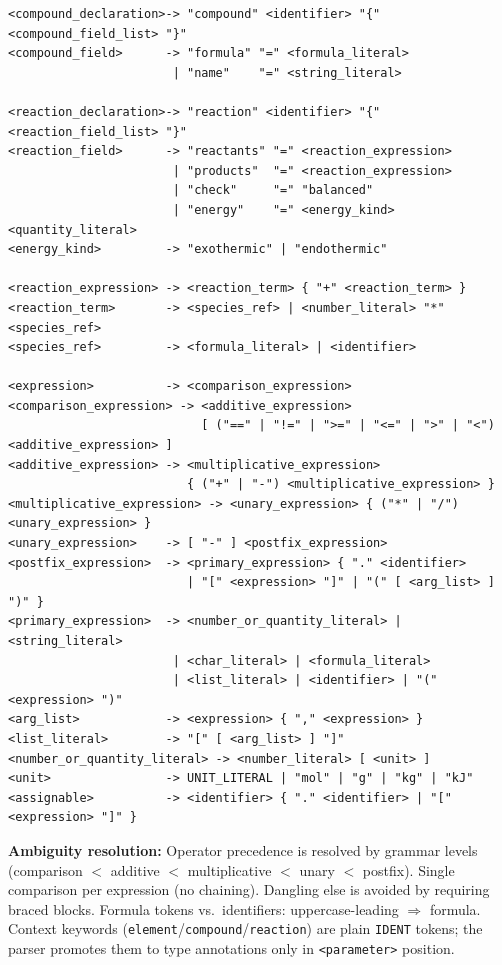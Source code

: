 \documentclass[11pt,a4paper]{article}
\newcommand{\code}[1]{\texttt{#1}}
\begin{document}
\begin{lstlisting}[style=ebnf]
<compound_declaration>-> "compound" <identifier> "{" <compound_field_list> "}"
<compound_field>      -> "formula" "=" <formula_literal>
                       | "name"    "=" <string_literal>

<reaction_declaration>-> "reaction" <identifier> "{" <reaction_field_list> "}"
<reaction_field>      -> "reactants" "=" <reaction_expression>
                       | "products"  "=" <reaction_expression>
                       | "check"     "=" "balanced"
                       | "energy"    "=" <energy_kind> <quantity_literal>
<energy_kind>         -> "exothermic" | "endothermic"

<reaction_expression> -> <reaction_term> { "+" <reaction_term> }
<reaction_term>       -> <species_ref> | <number_literal> "*" <species_ref>
<species_ref>         -> <formula_literal> | <identifier>

<expression>          -> <comparison_expression>
<comparison_expression> -> <additive_expression>
                           [ ("==" | "!=" | ">=" | "<=" | ">" | "<") <additive_expression> ]
<additive_expression> -> <multiplicative_expression>
                         { ("+" | "-") <multiplicative_expression> }
<multiplicative_expression> -> <unary_expression> { ("*" | "/") <unary_expression> }
<unary_expression>    -> [ "-" ] <postfix_expression>
<postfix_expression>  -> <primary_expression> { "." <identifier>
                         | "[" <expression> "]" | "(" [ <arg_list> ] ")" }
<primary_expression>  -> <number_or_quantity_literal> | <string_literal>
                       | <char_literal> | <formula_literal>
                       | <list_literal> | <identifier> | "(" <expression> ")"
<arg_list>            -> <expression> { "," <expression> }
<list_literal>        -> "[" [ <arg_list> ] "]"
<number_or_quantity_literal> -> <number_literal> [ <unit> ]
<unit>                -> UNIT_LITERAL | "mol" | "g" | "kg" | "kJ"
<assignable>          -> <identifier> { "." <identifier> | "[" <expression> "]" }
\end{lstlisting}

\textbf{Ambiguity resolution:} Operator precedence is resolved by grammar levels (comparison $<$ additive $<$ multiplicative $<$ unary $<$ postfix). Single comparison per expression (no chaining). Dangling else is avoided by requiring braced blocks. Formula tokens vs.\ identifiers: uppercase-leading $\Rightarrow$ formula. Context keywords (\code{element}/\code{compound}/\code{reaction}) are plain \code{IDENT} tokens; the parser promotes them to type annotations only in \texttt{<parameter>} position.
\end{document}
